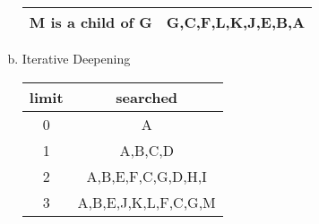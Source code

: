 \documentclass{math}
\begin{document}
\begin{enumerate}[(a)]
\begin{center}
\begin{tabular}{|c|c|}
      M is a child of G & G,C,F,L,K,J,E,B,A \\ \hline
    \end{tabular}
  \end{center}
  \item Iterative Deepening
  \begin{center}
    \begin{tabular}{|c|c|}
      \hline
      limit & searched \\ \hline
      0 & A \\ \hline
      1 & A,B,C,D \\ \hline
      2 & A,B,E,F,C,G,D,H,I \\ \hline
      3 & A,B,E,J,K,L,F,C,G,M \\ \hline
    \end{tabular}
  \end{center}
\end{enumerate}
\end{document}

